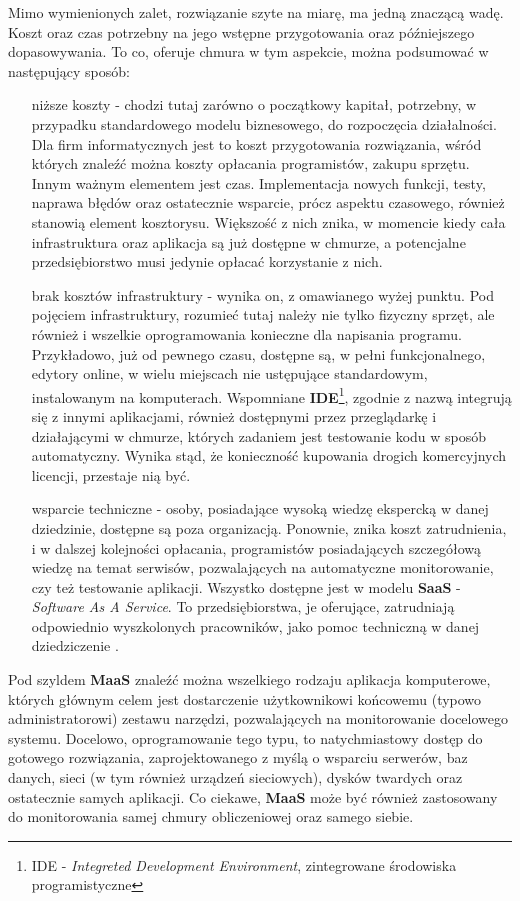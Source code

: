 Mimo wymienionych zalet, rozwiązanie szyte na miarę, ma jedną znaczącą wadę. Koszt oraz czas potrzebny na jego wstępne przygotowania oraz
późniejszego dopasowywania. To co, oferuje chmura w tym aspekcie, można podsumować w następujący sposób:
\begin{itemize}
    \item[niższe koszty] - chodzi tutaj zarówno o początkowy kapitał, potrzebny, w przypadku standardowego modelu biznesowego, do
    rozpoczęcia działalności. Dla firm informatycznych jest to koszt przygotowania rozwiązania, wśród których znaleźć
    można koszty opłacania programistów, zakupu sprzętu. Innym ważnym elementem jest czas. Implementacja nowych funkcji, testy, naprawa
    błędów oraz ostatecznie wsparcie, prócz aspektu czasowego, również stanowią element kosztorysu. Większość z nich znika, w momencie
    kiedy cała infrastruktura oraz aplikacja są już dostępne w chmurze, a potencjalne przedsiębiorstwo musi jedynie opłacać korzystanie z nich.
    \item[brak kosztów infrastruktury] - wynika on, z omawianego wyżej punktu. Pod pojęciem infrastruktury, rozumieć tutaj należy nie
    tylko fizyczny sprzęt, ale również i wszelkie oprogramowania konieczne dla napisania programu. Przykładowo, już od pewnego czasu,
    dostępne są, w pełni funkcjonalnego, edytory online, w wielu miejscach nie ustępujące standardowym, instalowanym na komputerach.
    Wspomniane \textbf{IDE}\footnote{IDE - \textit{Integreted Development Environment}, zintegrowane środowiska programistyczne}, zgodnie
    z nazwą integrują się z innymi aplikacjami, również dostępnymi przez przeglądarkę i działającymi w chmurze, których zadaniem jest
    testowanie kodu w sposób automatyczny. Wynika stąd, że konieczność kupowania drogich komercyjnych licencji, przestaje nią być.
    \item[wsparcie techniczne] - osoby, posiadające wysoką wiedzę ekspercką w danej dziedzinie, dostępne są poza organizacją. Ponownie,
    znika koszt zatrudnienia, i w dalszej kolejności opłacania, programistów posiadających szczegółową wiedzę na temat serwisów, pozwalających
    na automatyczne monitorowanie, czy też testowanie aplikacji. Wszystko dostępne jest w modelu \textbf{SaaS} - \textit{Software As A Service}.
    To przedsiębiorstwa, je oferujące, zatrudniają odpowiednio wyszkolonych pracowników, jako pomoc techniczną w danej dziedziczenie \cite{maas_does_it_work}.
\end{itemize}

Pod szyldem \textbf{MaaS} znaleźć można wszelkiego rodzaju aplikacja komputerowe, których głównym celem jest dostarczenie użytkownikowi końcowemu (typowo administratorowi) zestawu narzędzi, pozwalających na monitorowanie docelowego systemu. Docelowo, oprogramowanie tego typu, to natychmiastowy dostęp do gotowego rozwiązania,
zaprojektowanego z myślą o wsparciu serwerów, baz danych, sieci (w tym również urządzeń sieciowych), dysków twardych
oraz ostatecznie samych aplikacji. Co ciekawe, \textbf{MaaS} może być również zastosowany do monitorowania
samej chmury obliczeniowej oraz samego siebie. 